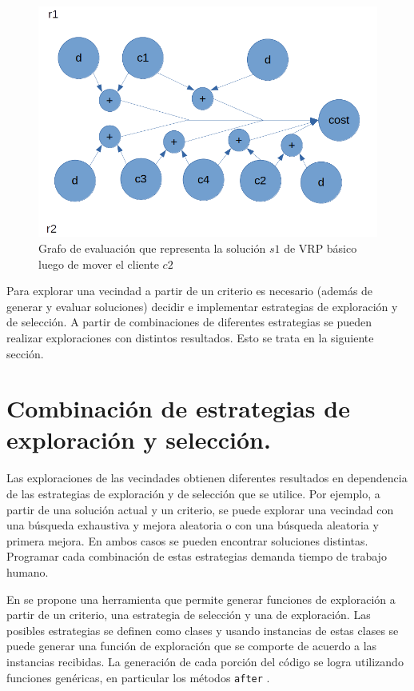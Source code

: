 \begin{figure}
	\centering
	\includegraphics[width=0.9\linewidth]{Graphics/eval-graph-4}
	\caption{Grafo de evaluación que representa la solución $s1$ de VRP básico luego de mover el cliente $c2$}
	\label{fig:eval-graph-4}
\end{figure}

Para explorar una vecindad a partir de un criterio es necesario (además de generar y evaluar soluciones) decidir e implementar estrategias de exploración y de selección. A partir de combinaciones de diferentes estrategias se pueden realizar exploraciones con distintos resultados. Esto se trata en la siguiente sección.

\section{Combinación de estrategias de exploración y selección.}\label{1-Heidy}
Las exploraciones de las vecindades obtienen diferentes resultados en dependencia de las estrategias de exploración y de selección que se utilice. Por ejemplo, a partir de una solución actual y un criterio, se puede explorar una vecindad con una búsqueda exhaustiva y mejora aleatoria o con una búsqueda aleatoria y primera mejora. En ambos casos se pueden encontrar soluciones distintas. Programar cada combinación de estas estrategias demanda tiempo de trabajo humano.

En \cite{Heidy} se propone una herramienta que permite generar funciones de exploración a partir de un criterio, una estrategia de selección y una de exploración. Las posibles estrategias se definen como clases y usando instancias de estas clases se puede generar una función de exploración que se comporte de acuerdo a las instancias recibidas. La generación de cada porción del código se logra utilizando funciones genéricas, en particular los métodos \texttt{after} \cite{Lisp2006}.

